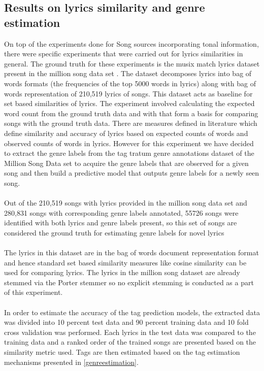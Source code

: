 \subsection{Results on lyrics similarity and genre estimation} \label{genrelabels}

\noindent On top of the experiments done for Song sources incorporating tonal information, there were specific experiments that were carried out for lyrics similarities in general. The ground truth for these experiments is the musix match lyrics dataset present in the million song data set \cite{msd}. The dataset decomposes lyrics into bag of words formats (the frequencies of the top 5000 words in lyrics) along with bag of words representation of 210,519 lyrics of songs. This dataset acts as baseline for set based similarities of lyrics. The experiment involved calculating the expected word count from the ground truth data and with that form a basis for comparing songs with the ground truth data. There are measures defined in literature \cite{lyricsRanking} which define similarity and accuracy of lyrics based on expected counts of words and observed counts of words in lyrics. However for this experiment we have decided to extract the genre labels from the tag tratum genre annotations dataset of the Million Song Data set \cite{msd} to acquire the genre labels that are observed for a given song and then build a predictive model that outputs genre labels for a newly seen song. \\\\
Out of the 210,519 songs with lyrics provided in the million song data set and 280,831 songs with corresponding genre labels annotated, 55726 songs were identified with both lyrics and genre labels present, so this set of songs are considered the ground truth for estimating genre labels for novel lyrics \\\\ 
The lyrics in this dataset are in the bag of words document representation format and hence standard set based similarity measures like cosine similarity can be used for comparing lyrics. The lyrics in the million song dataset are already stemmed via the Porter stemmer \cite{msd} so no explicit stemming is conducted as a part of this experiment.\\\\
In order to estimate the accuracy of the tag prediction models, the extracted data was divided into 10 percent test data and 90 percent training data and 10 fold cross validation was performed. Each lyrics in the test data was compared to the training data and a ranked order of the trained songs are presented based on the similarity metric used. Tags are then estimated based on the tag estimation mechanisms presented in \ref{genreestimation}. \\\\
